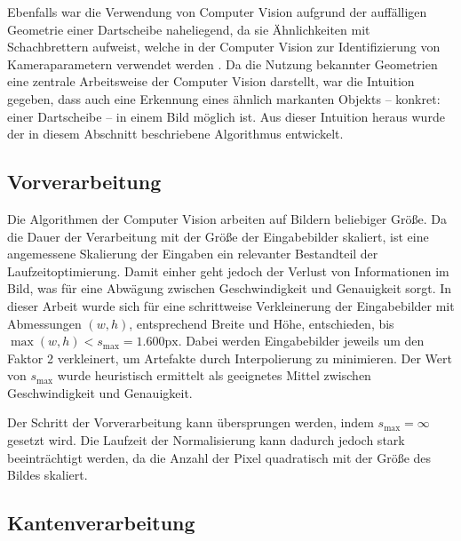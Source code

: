 Ebenfalls war die Verwendung von Computer Vision aufgrund der auffälligen Geometrie einer Dartscheibe naheliegend, da sie Ähnlichkeiten mit Schachbrettern aufweist, welche in der Computer Vision zur Identifizierung von Kameraparametern verwendet werden \cite{cv_general}. Da die Nutzung bekannter Geometrien eine zentrale Arbeitsweise der Computer Vision darstellt, war die Intuition gegeben, dass auch eine Erkennung eines ähnlich markanten Objekts -- konkret: einer Dartscheibe -- in einem Bild möglich ist. Aus dieser Intuition heraus wurde der in diesem Abschnitt beschriebene Algorithmus entwickelt.


\subsection{Vorverarbeitung}
\label{sec:vorverarbeitung}

Die Algorithmen der Computer Vision arbeiten auf Bildern beliebiger Größe. Da die Dauer der Verarbeitung mit der Größe der Eingabebilder skaliert, ist eine angemessene Skalierung der Eingaben ein relevanter Bestandteil der Laufzeitoptimierung. Damit einher geht jedoch der Verlust von Informationen im Bild, was für eine Abwägung zwischen Geschwindigkeit und Genauigkeit sorgt. In dieser Arbeit wurde sich für eine schrittweise Verkleinerung der Eingabebilder mit Abmessungen $(w, h)$, entsprechend Breite und Höhe, entschieden, bis $\max (w, h) < s_\text{max} = 1.600\text{px}$. Dabei werden Eingabebilder jeweils um den Faktor 2 verkleinert, um Artefakte durch Interpolierung zu minimieren. Der Wert von $s_\text{max}$ wurde heuristisch ermittelt als geeignetes Mittel zwischen Geschwindigkeit und Genauigkeit.

Der Schritt der Vorverarbeitung kann übersprungen werden, indem $s_\text{max} = \infty$ gesetzt wird. Die Laufzeit der Normalisierung kann dadurch jedoch stark beeinträchtigt werden, da die Anzahl der Pixel quadratisch mit der Größe des Bildes skaliert.


\subsection{Kantenverarbeitung}
\label{sec:kanten}

